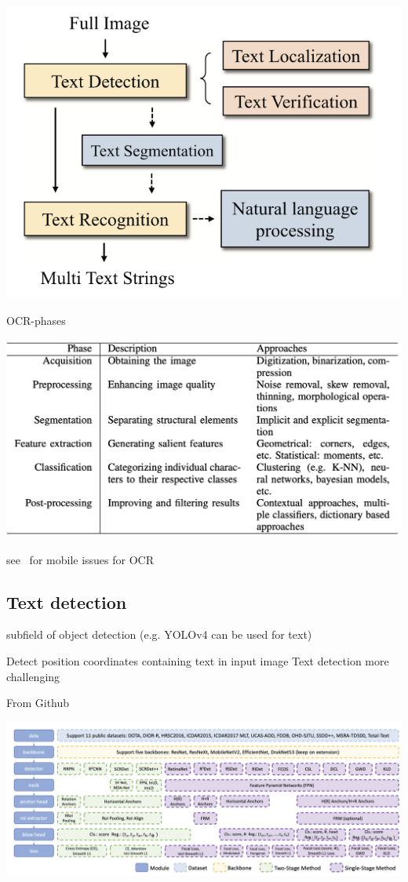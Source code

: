 \includegraphics[width=\textwidth]{img/OCR-Pipeline.png}

OCR-phases~\cite{sourvanos_challenges_2018}

\includegraphics[width=\textwidth]{img/OCR-Phases.png}

see~\cite{sourvanos_challenges_2018} for mobile issues for \ac{OCR}


\subsection*{Text detection}
subfield of object detection (e.g. YOLOv4 can be used for text)

Detect position coordinates containing text in input image
Text detection more challenging

From Github~\citep{noauthor_yangxue0827rotationdetection_nodate}

\includegraphics[width=\textwidth]{img/Detection-Modules.png}

